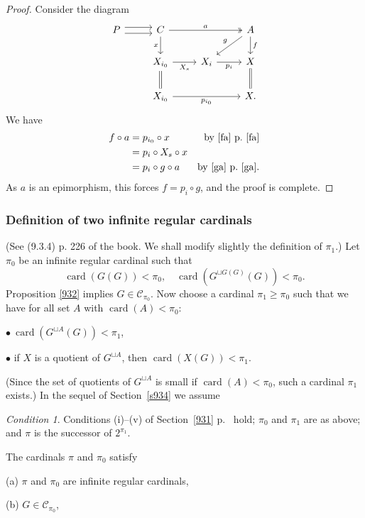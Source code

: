 \documentclass[12pt]{article}%
\theoremstyle{remark}
\newtheorem{cond}[thm]{Condition}
\theoremstyle{definition}
\newcommand{\bu}{\bullet}
\newcommand{\nn}{\noindent}
\newcommand{\C}{\mathcal C}
\DeclareMathOperator{\card}{card}%
\begin{document}
\begin{proof}
Consider the diagram 
$$
\begin{tikzcd}
P\ar[yshift=0.7ex]{r}\ar[yshift=-0.7ex]{r}&C\ar{d}[swap]{x}\ar[two heads]{rr}{a}&&A\ar{dl}[swap]{g}\ar{d}{f}\\ 
{}&X_{i_0}\ar{r}[swap]{X_s}\ar[equal]{d}&X_i\ar{r}[swap]{p_i}&X\ar[equal]{d}\\ 
{}&X_{i_0}\ar{rr}[swap]{p_{i_0}}&&X.
\end{tikzcd}
$$ 
We have 
%
\begin{align*}
f\circ a&=p_{i_0}\circ x&\text{by \eqref{fa} p.~\pageref{fa}}\\ 
&=p_i\circ X_s\circ x\\ 
&=p_i\circ g\circ a&\text{by \eqref{ga} p.~\pageref{ga}}.
\end{align*}
%
As $a$ is an epimorphism, this forces $f=p_i\circ g$, and the proof is complete.
\end{proof}


\subsubsection{Definition of two infinite regular cardinals}\label{tirg}

(See (9.3.4) p. 226 of the book. We shall modify slightly the definition of $\pi_1$.) Let $\pi_0$ be an infinite regular cardinal such that 
$$
\card(G(G))<\pi_0,\quad\card(G^{\sqcup G(G)}(G))<\pi_0.
$$ 
Proposition \ref{932} implies $G\in\C_{\pi_0}$. Now choose a cardinal $\pi_1\ge\pi_0$ such that we have for all set $A$ with $\card(A)<\pi_0$: 

$\bu\ \card(G^{\sqcup A}(G))<\pi_1$, 

$\bu$ if $X$ is a quotient of $G^{\sqcup A}$, then $\card(X(G))<\pi_1$. 

\nn(Since the set of quotients of $G^{\sqcup A}$ is small if $\card(A)<\pi_0$, such a cardinal $\pi_1$ exists.) In the sequel of Section~\ref{s934} we assume 

\begin{cond}\label{ass}
Conditions (i)--(v) of Section~\ref{931} p.~\pageref{931} hold; $\pi_0$ and $\pi_1$ are as above; and $\pi$ is the successor of $2^{\pi_1}$.
\end{cond}

\nn The cardinals $\pi$ and $\pi_0$ satisfy 

(a) $\pi$ and $\pi_0$ are infinite regular cardinals,

(b) $G\in\C_{\pi_0}$,
\end{document}
